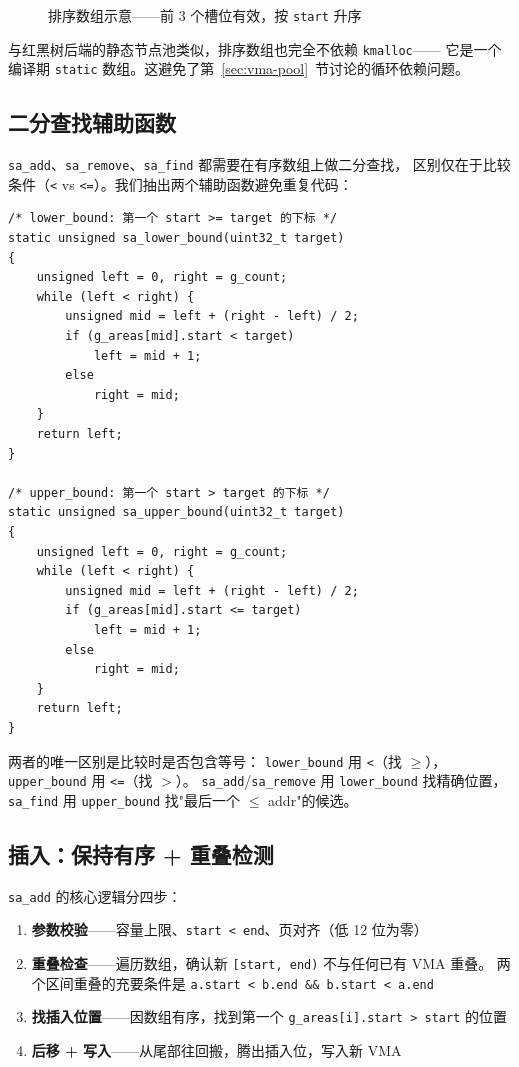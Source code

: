 \begin{figure}[H]
  \centering
  
  \caption{排序数组示意——前 3 个槽位有效，按 \texttt{start} 升序}
  \label{fig:vma-sorted-array}
\end{figure}

与红黑树后端的静态节点池类似，排序数组也完全不依赖 \texttt{kmalloc}——
它是一个编译期 \texttt{static} 数组。这避免了第~\ref{sec:vma-pool}~节讨论的循环依赖问题。

\subsection{二分查找辅助函数}

\texttt{sa\_add}、\texttt{sa\_remove}、\texttt{sa\_find} 都需要在有序数组上做二分查找，
区别仅在于比较条件（\texttt{<} vs \texttt{<=}）。我们抽出两个辅助函数避免重复代码：

\begin{lstlisting}[style=cstyle]
/* lower_bound: 第一个 start >= target 的下标 */
static unsigned sa_lower_bound(uint32_t target)
{
    unsigned left = 0, right = g_count;
    while (left < right) {
        unsigned mid = left + (right - left) / 2;
        if (g_areas[mid].start < target)
            left = mid + 1;
        else
            right = mid;
    }
    return left;
}

/* upper_bound: 第一个 start > target 的下标 */
static unsigned sa_upper_bound(uint32_t target)
{
    unsigned left = 0, right = g_count;
    while (left < right) {
        unsigned mid = left + (right - left) / 2;
        if (g_areas[mid].start <= target)
            left = mid + 1;
        else
            right = mid;
    }
    return left;
}
\end{lstlisting}

两者的唯一区别是比较时是否包含等号：
\texttt{lower\_bound} 用 \texttt{<}（找 $\geq$），\texttt{upper\_bound} 用 \texttt{<=}（找 $>$）。
\texttt{sa\_add}/\texttt{sa\_remove} 用 \texttt{lower\_bound} 找精确位置，
\texttt{sa\_find} 用 \texttt{upper\_bound} 找"最后一个 $\leq$ addr"的候选。

\subsection{插入：保持有序 + 重叠检测}

\texttt{sa\_add} 的核心逻辑分四步：

\begin{enumerate}
  \item \textbf{参数校验}——容量上限、\texttt{start < end}、页对齐（低 12 位为零）
  \item \textbf{重叠检查}——遍历数组，确认新 \texttt{[start, end)} 不与任何已有 VMA 重叠。
        两个区间重叠的充要条件是 \texttt{a.start < b.end \&\& b.start < a.end}
  \item \textbf{找插入位置}——因数组有序，找到第一个 \texttt{g\_areas[i].start > start} 的位置
  \item \textbf{后移 + 写入}——从尾部往回搬，腾出插入位，写入新 VMA
\end{enumerate}

